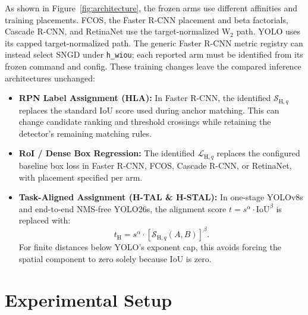 \documentclass[11pt,a4paper]{article}
\begin{document}
As shown in Figure~\ref{fig:architecture}, the frozen arms use different affinities and training placements. FCOS, the Faster R-CNN placement and beta factorials, Cascade R-CNN, and RetinaNet use the target-normalized W$_2$ path. YOLO uses its capped target-normalized path. The generic Faster R-CNN metric registry can instead select SNGD under \texttt{h\_wiou}; each reported arm must be identified from its frozen command and config. These training changes leave the compared inference architectures unchanged:
\begin{itemize}
  \item \textbf{RPN Label Assignment (HLA):} In Faster R-CNN, the identified $\mathcal{S}_{\mathrm{H},q}$ replaces the standard IoU score used during anchor matching. This can change candidate ranking and threshold crossings while retaining the detector's remaining matching rules.
  \item \textbf{RoI / Dense Box Regression:} The identified $\mathcal{L}_{\mathrm{H},q}$ replaces the configured baseline box loss in Faster R-CNN, FCOS, Cascade R-CNN, or RetinaNet, with placement specified per arm.
  \item \textbf{Task-Aligned Assignment (H-TAL \& H-STAL):} In one-stage YOLOv8s and end-to-end NMS-free YOLO26s, the alignment score $t = s^\alpha \cdot \mathrm{IoU}^\beta$ is replaced with:
  \begin{equation}
    \label{eq:htal}
    t_{\mathrm{H}} = s^\alpha \cdot \left[\mathcal{S}_{\mathrm{H},q}(A, B)\right]^\beta.
  \end{equation}
  For finite distances below YOLO's exponent cap, this avoids forcing the spatial component to zero solely because IoU is zero.
\end{itemize}


\section{Experimental Setup}
\label{sec:setup}
\end{document}
